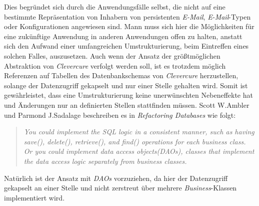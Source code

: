 \newline
\newline
Dies begründet sich durch die Anwendungsfälle selbst, die nicht auf eine bestimmte Repräsentation von Inhabern von persistenten \emph{E-Mail}, \emph{E-Mail}-Typen oder Konfigurationen angewiesen sind. Mann muss sich hier die Möglichkeiten für eine zukünftige Anwendung in anderen Anwendungen offen zu halten, anstatt sich den Aufwand einer umfangreichen Umstrukturierung, beim Eintreffen eines solchen Falles, auszusetzen. 
\newline
\newline
Auch wenn der Ansatz der größtmöglichen Abstraktion von \emph{Clevercure} verfolgt werden soll, ist es trotzdem möglich Referenzen auf Tabellen des Datenbankschemas von \emph{Clevercure} herzustellen, solange der Datenzugriff gekapselt und nur einer Stelle gehalten wird. Somit ist gewährleistet, dass eine Umstrukturierung keine unerwünschten Nebeneffekte hat und Änderungen nur an definierten Stellen stattfinden müssen. Scott W.Ambler und Parmond J.Sadalage beschreiben es in 
\emph{Refactoring Databases} \cite[66]{refactoreDatabase} wie folgt:
\begin{quote}
\emph{You could implement the SQL logic in a consistent manner, such as having save(), delete(), retrieve(), and find() operations for each business class. Or you could implement data access objects(DAOs), classes that implement the data access logic separately from business classes.}
\end{quote}
Natürlich ist der Ansatz mit \emph{DAOs} vorzuziehen, da hier der Datenzugriff gekapselt an einer Stelle und nicht zerstreut über mehrere \emph{Business}-Klassen implementiert wird.
\newpage
